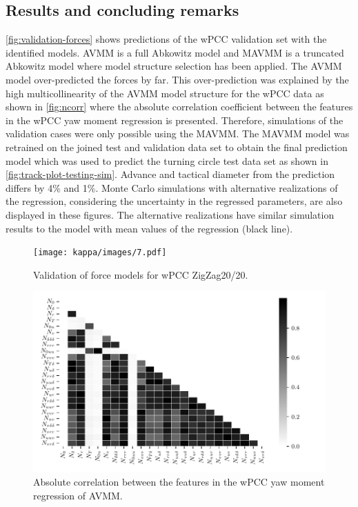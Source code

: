 \subsection*{Results and concluding remarks}
\autoref{fig:validation-forces} shows predictions of the wPCC validation set with the identified models. AVMM is a full Abkowitz model and MAVMM is a truncated Abkowitz model where model structure selection has been applied. The AVMM model over-predicted the forces by far. 
This over-prediction was  explained by the high multicollinearity of the AVMM model structure for the wPCC data as shown in \autoref{fig:ncorr}  where the absolute correlation coefficient between the features in the wPCC yaw moment regression is presented.
Therefore, simulations of the validation cases were only possible using the MAVMM. 
The MAVMM model was retrained on the joined test and validation data set to obtain the final prediction model which was used to predict the turning circle test data set as shown in \autoref{fig:track-plot-testing-sim}. Advance and tactical diameter \cite{imoStandardsShipManoeuvrability2002} from the prediction differs by 4\% and 1\%. Monte Carlo simulations with alternative realizations of the regression, considering the uncertainty in the regressed parameters, are also displayed in these figures. The alternative realizations have similar simulation results to the model with mean values of the regression (black line).
\begin{figure}[h]
\centering
\texttt{[image: kappa/images/7.pdf]}
\caption{Validation of force models for wPCC ZigZag20/20.}\label{fig:validation-forces}
\end{figure}
\begin{figure}[h]
\centering
\includegraphics[width=1.0\textwidth]{kappa/images/10.pdf}

    \caption{Absolute correlation between the features in the wPCC yaw moment regression of AVMM.}

\label{fig:ncorr}
\end{figure}
